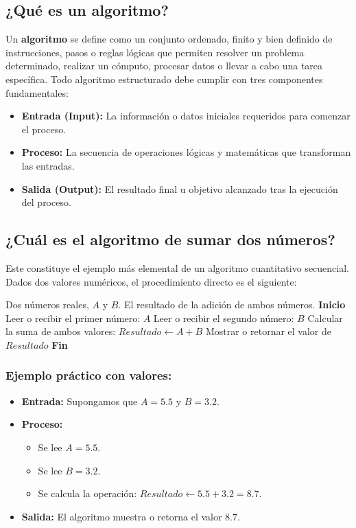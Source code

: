 \documentclass[12pt]{article}
\begin{document}
\subsection{¿Qué es un algoritmo?}
Un \textbf{algoritmo} se define como un conjunto ordenado, finito y bien definido de instrucciones, pasos o reglas lógicas que permiten resolver un problema determinado, realizar un cómputo, procesar datos o llevar a cabo una tarea específica. Todo algoritmo estructurado debe cumplir con tres componentes fundamentales:
\begin{itemize}
    \item \textbf{Entrada (Input):} La información o datos iniciales requeridos para comenzar el proceso.
    \item \textbf{Proceso:} La secuencia de operaciones lógicas y matemáticas que transforman las entradas.
    \item \textbf{Salida (Output):} El resultado final u objetivo alcanzado tras la ejecución del proceso.
\end{itemize}

\subsection{¿Cuál es el algoritmo de sumar dos números?}
Este constituye el ejemplo más elemental de un algoritmo cuantitativo secuencial. Dados dos valores numéricos, el procedimiento directo es el siguiente:
\begin{algorithm}[H]
\caption{Suma de dos números}
\begin{algorithmic}[1]
    \REQUIRE Dos números reales, $A$ y $B$.
    \ENSURE El resultado de la adición de ambos números.
    \STATE \textbf{Inicio}
    \STATE Leer o recibir el primer número: $A$
    \STATE Leer o recibir el segundo número: $B$
    \STATE Calcular la suma de ambos valores: $Resultado \leftarrow A + B$
    \STATE Mostrar o retornar el valor de $Resultado$
    \STATE \textbf{Fin}
\end{algorithmic}
\end{algorithm}

\subsubsection*{Ejemplo práctico con valores:}
\begin{itemize}
    \item \textbf{Entrada:} Supongamos que $A = 5.5$ y $B = 3.2$.
    \item \textbf{Proceso:} 
    \begin{itemize}
        \item Se lee $A = 5.5$.
        \item Se lee $B = 3.2$.
        \item Se calcula la operación: $Resultado \leftarrow 5.5 + 3.2 = 8.7$.
    \end{itemize}
    \item \textbf{Salida:} El algoritmo muestra o retorna el valor $8.7$.
\end{itemize}
\end{document}
